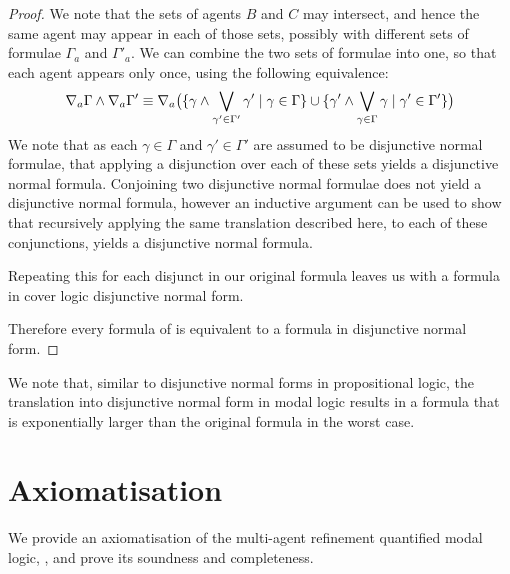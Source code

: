 \begin{proof}
We note that the sets of agents $B$ and $C$ may intersect, and hence the same
agent may appear in each of those sets, possibly with different sets of formulae
$\Gamma_a$ and $\Gamma'_a$. We can combine the two sets of formulae into one, so
that each agent appears only once, using the following equivalence:
$$
\nabla_a \Gamma \land \nabla_a \Gamma' \equiv 
\nabla_a \big( 
\{ \gamma \land \bigvee_{\gamma' \in \Gamma'} \gamma' \mid \gamma \in \Gamma \}
\cup
\{ \gamma' \land \bigvee_{\gamma \in \Gamma} \gamma \mid \gamma' \in \Gamma' \}
\big)
$$
We note that as each $\gamma \in \Gamma$ and $\gamma' \in \Gamma'$ are assumed
to be disjunctive normal formulae, that applying a disjunction over each of
these sets yields a disjunctive normal formula. Conjoining two disjunctive
normal formulae does not yield a disjunctive normal formula, however an
inductive argument can be used to show that recursively applying the same
translation described here, to each of these conjunctions, yields a disjunctive
normal formula.

Repeating this for each disjunct in our original formula leaves us with a
formula in cover logic disjunctive normal form.

Therefore every formula of \lang{} is equivalent to a formula in disjunctive
normal form.
\end{proof}

We note that, similar to disjunctive normal forms in propositional logic, the
translation into disjunctive normal form in modal logic results in a formula
that is exponentially larger than the original formula in the worst case.

\section{Axiomatisation}

We provide an axiomatisation of the multi-agent refinement quantified modal
logic, \logicKF{}, and prove its soundness and completeness.

